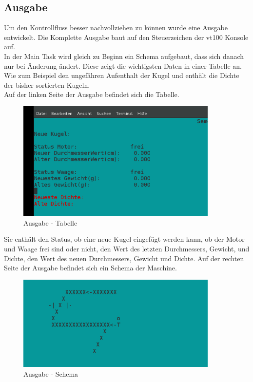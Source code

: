 \subsection{Ausgabe}
Um den Kontrollfluss besser nachvollziehen zu können wurde eine Ausgabe entwickelt.
Die Komplette Ausgabe baut auf den Steuerzeichen der vt100 Konsole auf.\\
In der Main Task wird gleich zu Beginn ein Schema aufgebaut, dass sich danach nur bei Änderung ändert.
Diese zeigt die wichtigsten Daten in einer Tabelle an.\\
Wie zum Beispiel den ungefähren Aufenthalt der Kugel und enthält die Dichte der bisher sortierten Kugeln.\\
Auf der linken Seite der Ausgabe befindet sich die Tabelle.\\
\begin{figure}[h]
\begin{center}
\includegraphics[width=10cm]{grafiken/Ausgabe_tabelle.png}
\caption{Ausgabe - Tabelle}
\label{Ausgabe}
\end{center}
\end{figure}
Sie enthält den Status, ob eine neue Kugel eingefügt werden kann, ob der Motor und Waage frei sind oder nicht, den Wert des letzten Durchmessers, Gewicht, und Dichte, den Wert des neuen Durchmessers, Gewicht und Dichte.
\newpage
\noindent
Auf der rechten Seite der Ausgabe befindet sich ein Schema der Maschine.
\begin{figure}[h]
\begin{center}
\includegraphics[width=10cm]{grafiken/Ausgabe_Schema.png}
\caption{Ausgabe - Schema}
\label{Ausgabe}
\end{center}
\end{figure}
